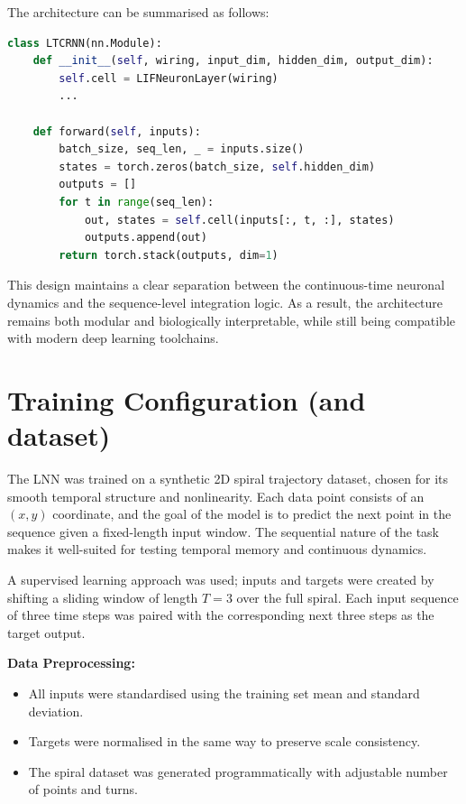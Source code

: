 \noindent The architecture can be summarised as follows:
\begin{lstlisting}[language=Python, caption={Structure of the LTCRNN module}]
class LTCRNN(nn.Module):
    def __init__(self, wiring, input_dim, hidden_dim, output_dim):
        self.cell = LIFNeuronLayer(wiring)
        ...
        
    def forward(self, inputs):
        batch_size, seq_len, _ = inputs.size()
        states = torch.zeros(batch_size, self.hidden_dim)
        outputs = []
        for t in range(seq_len):
            out, states = self.cell(inputs[:, t, :], states)
            outputs.append(out)
        return torch.stack(outputs, dim=1)
\end{lstlisting}

This design maintains a clear separation between the continuous-time neuronal dynamics and the sequence-level integration logic. As a result, the architecture remains both modular and biologically interpretable, while still being compatible with modern deep learning toolchains.

\section{Training Configuration (and dataset)}
The LNN was trained on a synthetic 2D spiral trajectory dataset, chosen for its smooth temporal structure and nonlinearity. Each data point consists of an $(x, y)$ coordinate, and the goal of the model is to predict the next point in the sequence given a fixed-length input window. The sequential nature of the task makes it well-suited for testing temporal memory and continuous dynamics.

A supervised learning approach was used; inputs and targets were created by shifting a sliding window of length $T = 3$ over the full spiral. Each input sequence of three time steps was paired with the corresponding next three steps as the target output.

\vspace{1em}
\noindent \textbf{Data Preprocessing:}
\begin{itemize}
    \item All inputs were standardised using the training set mean and standard deviation.
    \item Targets were normalised in the same way to preserve scale consistency.
    \item The spiral dataset was generated programmatically with adjustable number of points and turns.
\end{itemize}

